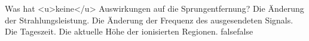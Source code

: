     {Was hat <u>keine</u> Auswirkungen auf die Sprungentfernung?}
    {Die Änderung der Strahlungsleistung.}
    {Die Änderung der Frequenz des ausgesendeten Signals.}
    {Die Tageszeit.}
    {Die aktuelle Höhe der ionisierten Regionen.}
    {false}{false}